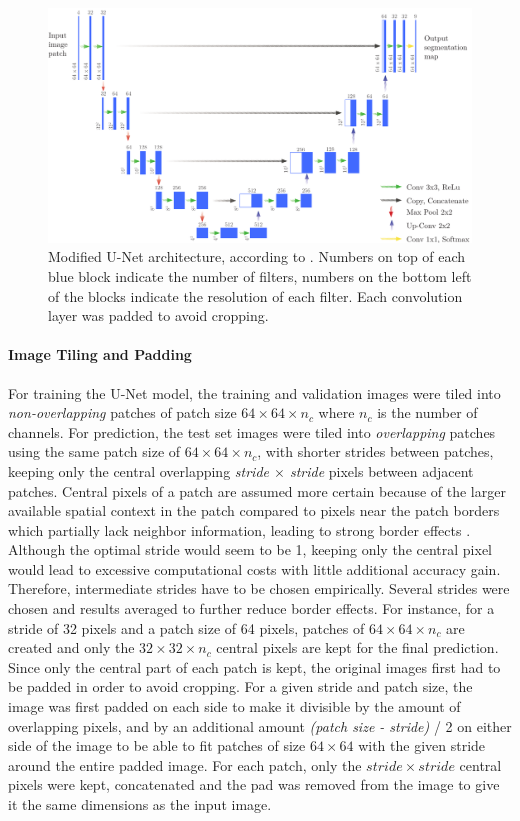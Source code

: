 \documentclass[10pt]{article}
\begin{document}
\begin{figure}[ht]
    \centering
    \includegraphics[width=\textwidth]{Schema/unet}
    \caption{Modified U-Net architecture, according to \textcite{ronneberger2015u}. Numbers on top of each blue block indicate the number of filters, numbers on the bottom left of the blocks indicate the resolution of each filter. Each convolution layer was padded to avoid cropping.} 
    \label{fig:u-net}
\end{figure}

\paragraph{Image Tiling and Padding} For training the U-Net model, the training and validation images were tiled into \textit{non-overlapping} patches of patch size $64 \times 64 \times n_c$ where $n_c$ is the number of channels. For prediction, the test set images were tiled into \textit{overlapping} patches using the same patch size of $64 \times 64 \times n_c$, with shorter strides between patches, keeping only the central overlapping \textit{stride $\times$ stride} pixels between adjacent patches. Central pixels of a patch are assumed more certain because of the larger available spatial context in the patch compared to pixels near the patch borders which partially lack neighbor information, leading to strong border effects \cite{Marmanis2016SemanticSO}. Although the optimal stride would seem to be 1, keeping only the central pixel would lead to excessive computational costs with little additional accuracy gain. Therefore, intermediate strides have to be chosen empirically. Several strides were chosen and results averaged to further reduce border effects. For instance, for a stride of 32 pixels and a patch size of 64 pixels, patches of $64 \times 64 \times n_c$ are created and only the $32 \times 32 \times n_c$ central pixels are kept for the final prediction. Since only the central part of each patch is kept, the original images first had to be padded in order to avoid cropping. For a given stride and patch size, the image was first padded on each side to make it divisible by the amount of overlapping pixels, and by an additional amount \textit{(patch size - stride)} / 2 on either side of the image to be able to fit patches of size $64 \times 64$ with the given stride around the entire padded image. For each patch, only the $stride \times stride$ central pixels were kept, concatenated and the pad was removed from the image to give it the same dimensions as the input image.
\end{document}
